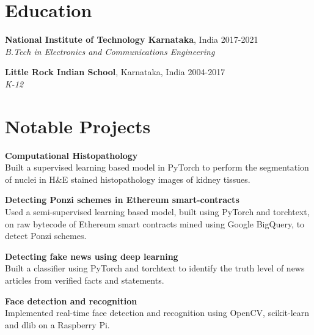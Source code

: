\documentclass[margin]{res}
\begin{document}
  \address{National Institute of Technology\\
           Karnataka, India\\
           russel.171ec143@nitk.edu.in}
  \address{{\faMobile} (91+) 9611212081\\
           {\faLinkedin} \href{https://linkedin.com/in/rshwndsz}{linkedin.com/in/rshwndsz}\\
           {\faGithub} \href{https://github.com/rshwndsz}{github.com/rshwndsz}}


  \begin{resume}
    \section{Education}
      \textbf{National Institute of Technology Karnataka}, India\hfill
      2017-2021 \\
      {\sl B.Tech in Electronics and Communications Engineering}\hfill

      \textbf{Little Rock Indian School}, Karnataka, India\hfill
      2004-2017 \\
      {\sl K-12}\hfill


    \section{Notable Projects}
      \par
      \textbf{Computational Histopathology}\\
      Built a supervised learning based model in PyTorch to perform the segmentation of nuclei in H\&E stained histopathology images of kidney tissues.

      \par
      \textbf{Detecting Ponzi schemes in Ethereum smart-contracts}\\
      Used a semi-supervised learning based model, built using PyTorch and torchtext, on raw bytecode of Ethereum smart contracts mined using Google BigQuery, to detect Ponzi schemes.

      \par
      \textbf{Detecting fake news using deep learning}\\
      Built a classifier using PyTorch and torchtext to identify the truth level of news articles from verified facts and statements.

      \par
      \textbf{Face detection and recognition}\\
      Implemented real-time face detection and recognition using OpenCV, scikit-learn and dlib on a Raspberry Pi.



\end{resume}
\end{document}
